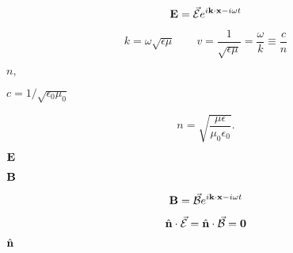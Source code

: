 \documentclass[10pt]{book}
\begin{document}
\begin{mdSnippets}
\newcommand{\vBB}{\vec{\mathcal{B}}}
\newcommand{\vEE}{\vec{\mathcal{E}}}
\newcommand{\vn}{\hat{\mathbf{n}}}

\begin{mdDisplaySnippet}[897069586463aa5d62c798d577b25811]%
\[%
\vb{E} = \va{\mathcal{E}} e^{i\vb{k} \cdot \vb{x} - i\omega t}
\]%
\end{mdDisplaySnippet}%
\begin{mdDisplaySnippet}[e5698db7073d212b4001a77dd8ad0bd4]%
\[%
k = \omega \sqrt{\epsilon \mu}
\qquad
v = \frac{1}{\sqrt{\epsilon \mu}} = \frac{\omega}{k} \equiv \frac{c}{n}
\]%
\end{mdDisplaySnippet}%
\begin{mdInlineSnippet}[1a58f249932a2915e61842f01ae0feca]%
$n,$\end{mdInlineSnippet}%
\begin{mdInlineSnippet}%
$c = 1/\sqrt{\epsilon_0\mu_0}$\end{mdInlineSnippet}%
\begin{mdDisplaySnippet}[45c61f2c5d8072b124319e48aa14d2f1]%
\[%
n = \sqrt{\frac{\mu\epsilon}{\mu_0\epsilon_0}}.
\]%
\end{mdDisplaySnippet}%
\begin{mdInlineSnippet}[3177c3b789270ed3013a4e6066f64dd6]%
$\vb{E}$\end{mdInlineSnippet}%
\begin{mdInlineSnippet}%
$\vb{B}$\end{mdInlineSnippet}%
\begin{mdDisplaySnippet}[3709260cdd4a998885708d9f134ff88a]%
\[%
\vb{B} = \vBB e^{i\vb{k} \cdot \vb{x} - i\omega t}
\]%
\end{mdDisplaySnippet}%
\begin{mdDisplaySnippet}[93f0395513d51d8af2fd426d4b5b303e]%
\[%
\vn \cdot \vEE = \vn \cdot \vBB = \vb{0}
\]%
\end{mdDisplaySnippet}%
\begin{mdInlineSnippet}%
$\hat{\vb{n}}$\end{mdInlineSnippet}%

\end{mdSnippets}
\end{document}
